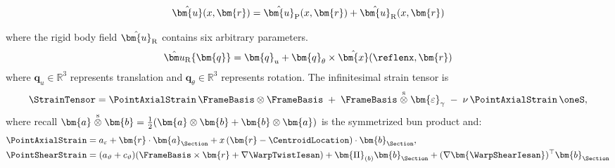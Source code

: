 \begin{equation}
\hat{\bm{u}}(x,\bm{r}) = \hat{\bm{u}}_{\rm P}(x,\bm{r}) + \hat{\bm{u}}_{\rm R}(x,\bm{r})
\label{eq:general-solution}
\end{equation}

where the rigid body field \(\hat{\bm{u}}_{\rm R}\) contains six arbitrary parameters. 
\begin{equation}
\begin{aligned}
\hat{\bm u}_{\rm R}\{\bm{q}\} 
&= \bm{q}_u + \bm{q}_\theta \times \hat{\bm{x}}(\reflenx,\bm{r}) \\
\end{aligned}
\label{eq:rigid-field}
\end{equation}
where
\(\bm{q}_u\in \mathbb{R}^3\)
represents translation and
\(\bm{q}_\theta\in \mathbb{R}^3\)
represents rotation. 
%
The infinitesimal strain tensor is
\[
\StrainTensor
= \PointAxialStrain\,\FrameBasis\otimes\FrameBasis
\;+\;\FrameBasis\stackrel{\rm s}{\otimes} \bm{\varepsilon}_{\gamma}
\;-\;\nu\,\PointAxialStrain\,\oneS,
\]
where recall \(\bm{a}\stackrel{\rm s}{\otimes}\bm{b} = \tfrac{1}{2} (\bm{a}\otimes\bm{b} + \bm{b}\otimes\bm{a})\) is the symmetrized bun product and:
\begin{subequations}
\begin{align}
\PointAxialStrain
&= a_{\varepsilon} + \bm{r}\cdot\bm{a}_{\Section}
+ x\,(\bm{r}-\CentroidLocation)\cdot\bm{b}_{\Section},
 \label{eq:iesan-point-axial-strain} \\
%
\PointShearStrain 
&= (a_{\vartheta} + c_{\vartheta})(\FrameBasis\times \bm{r} + \nabla\WarpTwistIesan) 
+\bm{\Pi}_{(b)}\bm{b}_{\Section}
+ (\nabla \bm{\WarpShearIesan})^{\top} \bm{b}_{\Section} 
\label{eq:iesan-point-shear-strain}
\end{align}
\label{eq:iesan-point-strain}
\end{subequations}

